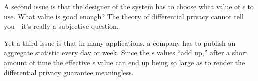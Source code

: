 A second issue is that the designer of the system has to choose
what value of $\epsilon$ to use. What value is good enough?
The theory of differential privacy cannot tell you---it's
really a subjective question.

Yet a third issue is that in many applications, a company has
to publish an aggregate statistic every day or week.
Since the $\epsilon$ values ``add up,'' after a short amount
of time the effective $\epsilon$ value can end up being
so large as to render the differential privacy guarantee
meaningless.

